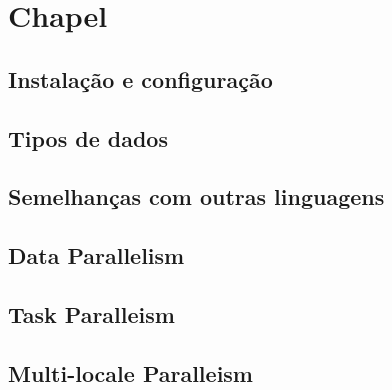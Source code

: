 \section{Chapel}
	\subsection{Instalação e configuração}
	\subsection{Tipos de dados}
	\subsection{Semelhanças com outras linguagens}
	\subsection{Data Parallelism}
	\subsection{Task Paralleism}
	\subsection{Multi-locale Paralleism}